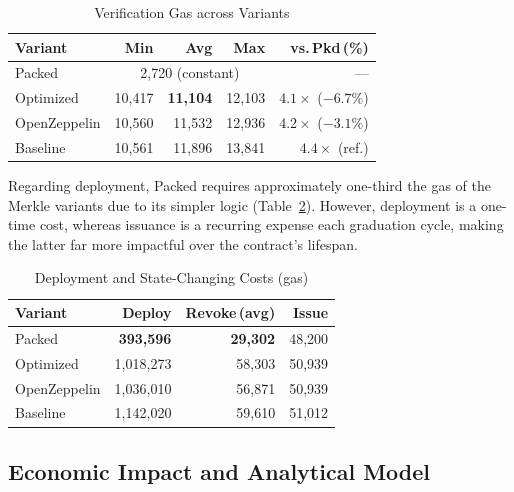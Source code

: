 \documentclass[conference]{IEEEtran}
\renewcommand{\arraystretch}{1.08}
\newcommand{\Vpacked}{Packed}
\newcommand{\Vbase}{Baseline}
\newcommand{\Voz}{OpenZeppelin}
\newcommand{\Vopt}{Optimized}
\begin{document}
\begin{table}[tbp]
\centering
\caption{Verification Gas across Variants}
\label{tab:verify}
\renewcommand{\arraystretch}{1.12}
\footnotesize
\setlength{\tabcolsep}{4.5pt}
\begin{tabular}{@{}lrrrr@{}}
\toprule
\textbf{Variant} & \textbf{Min} & \textbf{Avg} &
  \textbf{Max} & \textbf{vs.\,Pkd\,(\%)} \\
\midrule
\Vpacked{}
  & \multicolumn{3}{c}{2{,}720 (constant)} & --- \\
\addlinespace[2pt]
\Vopt{}   & 10{,}417 & \textbf{11{,}104} & 12{,}103
  & $4.1\times$ ($-6.7\%$) \\
\Voz{}    & 10{,}560 & 11{,}532 & 12{,}936
  & $4.2\times$ ($-3.1\%$) \\
\Vbase{}  & 10{,}561 & 11{,}896 & 13{,}841
  & $4.4\times$ (ref.) \\
\bottomrule
\end{tabular}
\end{table}

Regarding deployment, \Vpacked{} requires approximately one-third 
the gas of the Merkle variants due to its simpler logic (Table~\ref{tab:ops}). 
However, deployment is a one-time cost, whereas issuance is a recurring 
expense each graduation cycle, making the latter far more impactful 
over the contract's lifespan.

\begin{table}[tbp]
\centering
\caption{Deployment and State-Changing Costs (gas)}
\label{tab:ops}
\renewcommand{\arraystretch}{1.12}
\footnotesize
\setlength{\tabcolsep}{4pt}
\begin{tabular}{lrrr}
\toprule
\textbf{Variant} & \textbf{Deploy} &
  \textbf{Revoke\,(avg)} & \textbf{Issue} \\
\midrule
\Vpacked{}  & \textbf{393{,}596} & \textbf{29{,}302} & 48{,}200 \\
\Vopt{}     & 1{,}018{,}273      & 58{,}303            & 50{,}939 \\
\Voz{}      & 1{,}036{,}010      & 56{,}871            & 50{,}939 \\
\Vbase{}    & 1{,}142{,}020      & 59{,}610            & 51{,}012 \\
\bottomrule
\end{tabular}
\end{table}

\subsection{Economic Impact and Analytical Model}
\end{document}
